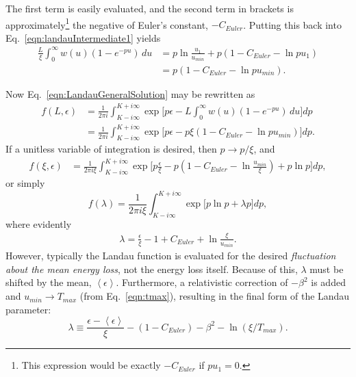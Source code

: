 The first term is easily evaluated, and the second term in brackets is approximately\footnote{This expression would be exactly $-C_{Euler}$ if $pu_1=0$.} the negative of Euler's constant, $-C_{Euler}$. Putting this back into Eq.~\eqref{eqn:landauIntermediate1} yields
\begin{align*}
\frac{L}{\xi}\int_0 ^\infty w(u)  (1-e^{-pu})\, du &=p \ln\frac{u_1}{u_{min}} + p(1-C_{Euler}-\ln pu_1)\\
&=p(1-C_{Euler}-\ln pu_{min}).
\end{align*}

Now Eq.~\eqref{eqn:LandauGeneralSolution} may be rewritten as
\begin{align*}
f(L,\epsilon)&=\frac{1}{2\pi i} \int_{K-i\infty} ^{K+i\infty} \exp\Big[p\epsilon-L\int_0 ^\infty w(u)  (1-e^{-pu})\, du\Big] dp\\
&= \frac{1}{2\pi i} \int_{K-i\infty} ^{K+i\infty} \exp\Big[p\epsilon-p\xi(1-C_{Euler}-\ln pu_{min})\Big] dp.
\end{align*}
If a unitless variable of integration is desired, then $p\rightarrow p/\xi$, and
\begin{align*}
f(\xi,\epsilon)&=\frac{1}{2\pi i \xi} \int_{K-i\infty} ^{K+i\infty} \exp\Big[p\frac{\epsilon}{\xi}-p(1-C_{Euler}-\ln \frac{u_{min}}{\xi})+p\ln p\Big] dp,
\end{align*}
or simply
\begin{equation}\label{eqn:landau}
f(\lambda)=\frac{1}{2\pi i \xi} \int_{K-i\infty} ^{K+i\infty} \exp\Big[p\ln p + \lambda p\Big] dp,
\end{equation}
where evidently
\begin{align*}
\lambda = \frac{\epsilon}{\xi} -1+C_{Euler}+\ln \frac{\xi}{u_{min}}.
\end{align*}
However, typically the Landau function is evaluated for the desired \emph{fluctuation about the mean energy loss}, not the energy loss itself. Because of this, $\lambda$ must be shifted by the mean, $\left< \epsilon \right>$. Furthermore, a relativistic correction of $-\beta ^2$ is added and $u_{min}\rightarrow T_{max}$ (from Eq.~\eqref{eqn:tmax}), resulting in the final form of the Landau parameter:
\begin{equation}\label{eqn:landauParameter}
\lambda \equiv \frac{\epsilon-\left<\epsilon\right>}{\xi}-(1-C_{Euler})-\beta ^2 -\ln (\xi/T_{max}).
\end{equation}

